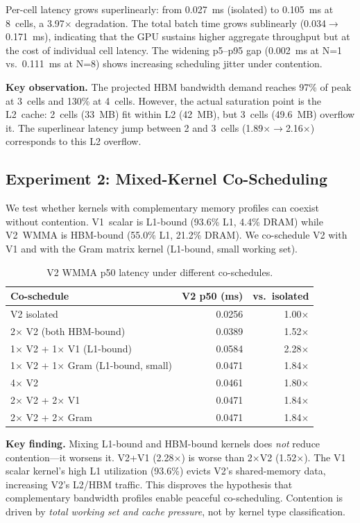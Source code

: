 Per-cell latency grows superlinearly: from 0.027~ms (isolated) to 0.105~ms at 8~cells, a 3.97$\times$ degradation. The total batch time grows sublinearly (0.034$\rightarrow$0.171~ms), indicating that the GPU sustains higher aggregate throughput but at the cost of individual cell latency. The widening p5--p95 gap (0.002~ms at N=1 vs.\ 0.111~ms at N=8) shows increasing scheduling jitter under contention.

\textbf{Key observation.} The projected HBM bandwidth demand reaches 97\% of peak at 3~cells and 130\% at 4~cells. However, the actual saturation point is the L2~cache: 2~cells (33~MB) fit within L2 (42~MB), but 3~cells (49.6~MB) overflow it. The superlinear latency jump between 2 and 3~cells (1.89$\times$$\rightarrow$2.16$\times$) corresponds to this L2 overflow.

\subsection{Experiment 2: Mixed-Kernel Co-Scheduling}
\label{sec:exp2}

We test whether kernels with complementary memory profiles can coexist without contention. V1~scalar is L1-bound (93.6\% L1, 4.4\% DRAM) while V2~WMMA is HBM-bound (55.0\% L1, 21.2\% DRAM). We co-schedule V2 with V1 and with the Gram matrix kernel (L1-bound, small working set).

\begin{table}[h]
\centering
\small
\caption{V2 WMMA p50 latency under different co-schedules.}
\label{tab:mixed}
\begin{tabular}{@{}lrr@{}}
\toprule
Co-schedule & V2 p50 (ms) & vs.\ isolated \\
\midrule
V2 isolated & 0.0256 & 1.00$\times$ \\
2$\times$ V2 (both HBM-bound) & 0.0389 & 1.52$\times$ \\
1$\times$ V2 + 1$\times$ V1 (L1-bound) & 0.0584 & 2.28$\times$ \\
1$\times$ V2 + 1$\times$ Gram (L1-bound, small) & 0.0471 & 1.84$\times$ \\
4$\times$ V2 & 0.0461 & 1.80$\times$ \\
2$\times$ V2 + 2$\times$ V1 & 0.0471 & 1.84$\times$ \\
2$\times$ V2 + 2$\times$ Gram & 0.0471 & 1.84$\times$ \\
\bottomrule
\end{tabular}
\end{table}

\textbf{Key finding.} Mixing L1-bound and HBM-bound kernels does \emph{not} reduce contention---it worsens it. V2+V1 (2.28$\times$) is worse than 2$\times$V2 (1.52$\times$). The V1 scalar kernel's high L1 utilization (93.6\%) evicts V2's shared-memory data, increasing V2's L2/HBM traffic. This disproves the hypothesis that complementary bandwidth profiles enable peaceful co-scheduling. Contention is driven by \emph{total working set and cache pressure}, not by kernel type classification.

